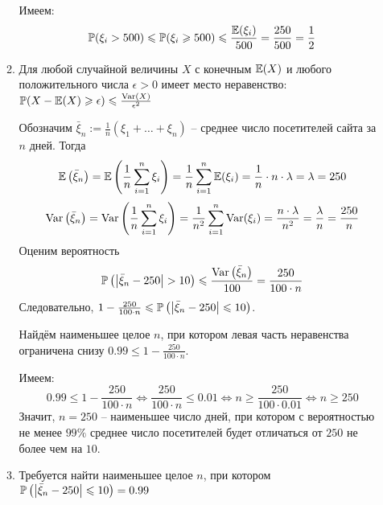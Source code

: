 \begin{enumerate}
\begin{enumerate}
Имеем:
\[
\P(\xi_i >500) \leq \P(\xi_i \geq 500) \leq \frac{\E(\xi_i)}{500} = \frac{250}{500} = \frac{1}{2}
\]
\item Для любой случайной величины $X$ с конечным $\E(X)$ и любого положительного числа $\epsilon > 0$ имеет место неравенство: $\P(X-\E(X)\geq\epsilon)\leq\frac{\Var(X)}{\epsilon^2}$

Обозначим $\bar{\xi}_n := \frac{1}{n} \left(\xi_1 + \ldots + \xi_n\right)$ – среднее число посетителей сайта за $n$ дней. Тогда
\[
\E\left(\bar{\xi}_n\right) = \E\left(\frac{1}{n} \sum_{i=1}^{n} \xi_i\right) = \frac{1}{n} \sum_{i=1}^{n} \E(\xi_i) = \frac{1}{n} \cdot n \cdot \lambda = \lambda = 250
\]
\[
\Var\left(\bar{\xi}_n\right) = \Var\left(\frac{1}{n} \sum_{i=1}^{n} \xi_i\right) = \frac{1}{n^2} \sum_{i=1}^{n} \Var (\xi_i) = \frac{n \cdot \lambda}{n^2} = \frac{\lambda}{n} = \frac{250}{n}
\]
Оценим вероятность
\[
\P\left(\left\vert\bar{\xi}_n-250\right\vert > 10\right) \leq \frac{\Var\left(\bar{\xi}_n\right)}{100} = \frac{250}{100\cdot n}
\]
Следовательно, $1 - \frac{250}{100\cdot n} \leq \P\left(\left\vert\bar{\xi}_n-250\right\vert \leq 10\right)$.

Найдём наименьшее целое $n$, при котором левая часть неравенства ограничена снизу $0.99 \leq 1 - \frac{250}{100\cdot n}$.

Имеем:
\[
0.99 \leq 1 - \frac{250}{100\cdot n} \Leftrightarrow \frac{250}{100\cdot n} \leq 0.01 \Leftrightarrow n \geq \frac{250}{100 \cdot 0.01} \Leftrightarrow n  \geq 250
\]
Значит, $n=250$ – наименьшее число дней, при котором с вероятностью не менее $99\%$ среднее число посетителей будет отличаться от $250$ не более чем на $10$.
\item  Требуется найти наименьшее целое $n$, при котором $\P\left(\left\vert\bar{\xi}_n-250\right\vert \leq 10\right) = 0.99$


\end{enumerate}
\end{enumerate}
